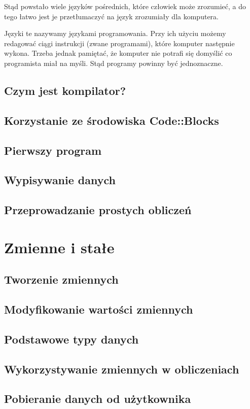 \documentclass[11pt]{book}
\begin{document}
Stąd powstało wiele języków pośrednich, które człowiek może zrozumieć, a do
tego łatwo jest je przetłumaczyć na język zrozumiały dla komputera.

Języki te nazywamy językami programowania. Przy ich użyciu możemy redagować
ciągi instrukcji (zwane programami), które komputer następnie wykona. Trzeba 
jednak pamiętać, że komputer nie potrafi się domyślić co programista miał na 
myśli. Stąd programy powinny być jednoznaczne.

\section{Czym jest kompilator?}
\section{Korzystanie ze środowiska Code::Blocks}
\section{Pierwszy program}
\section{Wypisywanie danych}
\section{Przeprowadzanie prostych obliczeń}

\chapter{Zmienne i stałe}
\section{Tworzenie zmiennych}
\section{Modyfikowanie wartości zmiennych}
\section{Podstawowe typy danych}
\section{Wykorzystywanie zmiennych w obliczeniach}
\section{Pobieranie danych od użytkownika}
\end{document}
